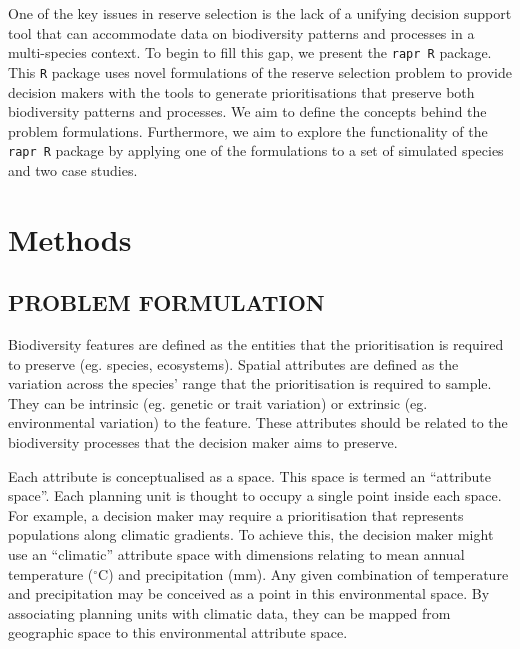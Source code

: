 \documentclass[11pt,]{article}
\begin{document}
One of the key issues in reserve selection is the lack of a unifying
decision support tool that can accommodate data on biodiversity patterns
and processes in a multi-species context. To begin to fill this gap, we
present the \texttt{rapr R} package. This \texttt{R} package uses novel
formulations of the reserve selection problem to provide decision makers
with the tools to generate prioritisations that preserve both
biodiversity patterns and processes. We aim to define the concepts
behind the problem formulations. Furthermore, we aim to explore the
functionality of the \texttt{rapr R} package by applying one of the
formulations to a set of simulated species and two case studies.

\section{Methods}\label{methods}

\subsection{PROBLEM FORMULATION}\label{problem-formulation}

Biodiversity features are defined as the entities that the
prioritisation is required to preserve (eg. species, ecosystems).
Spatial attributes are defined as the variation across the species'
range that the prioritisation is required to sample. They can be
intrinsic (eg. genetic or trait variation) or extrinsic (eg.
environmental variation) to the feature. These attributes should be
related to the biodiversity processes that the decision maker aims to
preserve.

Each attribute is conceptualised as a space. This space is termed an
``attribute space''. Each planning unit is thought to occupy a single
point inside each space. For example, a decision maker may require a
prioritisation that represents populations along climatic gradients. To
achieve this, the decision maker might use an ``climatic'' attribute
space with dimensions relating to mean annual temperature ($^{\circ}$C)
and precipitation (mm). Any given combination of temperature and
precipitation may be conceived as a point in this environmental space.
By associating planning units with climatic data, they can be mapped
from geographic space to this environmental attribute space.
\end{document}
